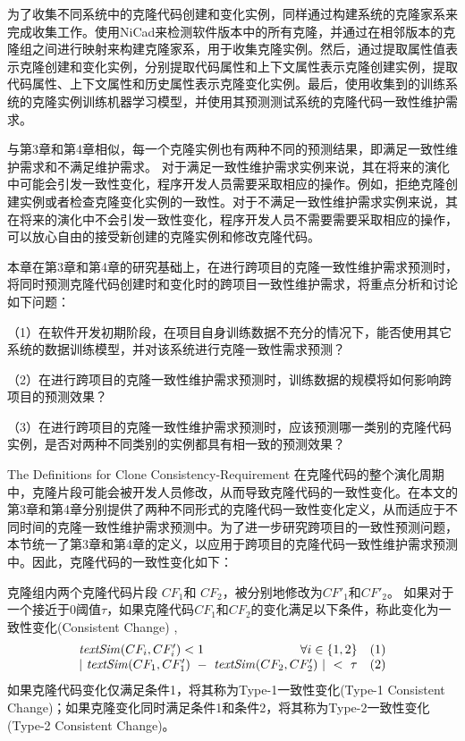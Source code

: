 为了收集不同系统中的克隆代码创建和变化实例，同样通过构建系统的克隆家系来完成收集工作。使用NiCad来检测软件版本中的所有克隆，并通过在相邻版本的克隆组之间进行映射来构建克隆家系，用于收集克隆实例。然后，通过提取属性值表示克隆创建和变化实例，分别提取代码属性和上下文属性表示克隆创建实例，提取代码属性、上下文属性和历史属性表示克隆变化实例。最后，使用收集到的训练系统的克隆实例训练机器学习模型，并使用其预测测试系统的克隆代码一致性维护需求。

与第3章和第4章相似，每一个克隆实例也有两种不同的预测结果，即满足一致性维护需求和不满足维护需求。
对于满足一致性维护需求实例来说，其在将来的演化中可能会引发一致性变化，程序开发人员需要采取相应的操作。例如，拒绝克隆创建实例或者检查克隆变化实例的一致性。对于不满足一致性维护需求实例来说，其在将来的演化中不会引发一致性变化，程序开发人员不需要需要采取相应的操作，可以放心自由的接受新创建的克隆实例和修改克隆代码。

本章在第3章和第4章的研究基础上，在进行跨项目的克隆一致性维护需求预测时，将同时预测克隆代码创建时和变化时的跨项目一致性维护需求，将重点分析和讨论如下问题：


（1）在软件开发初期阶段，在项目自身训练数据不充分的情况下，能否使用其它系统的数据训练模型，并对该系统进行克隆一致性需求预测？

（2）在进行跨项目的克隆一致性维护需求预测时，训练数据的规模将如何影响跨项目的预测效果？%

（3）在进行跨项目的克隆一致性维护需求预测时，应该预测哪一类别的克隆代码实例，是否对两种不同类别的实例都具有相一致的预测效果？

{The Definitions for Clone Consistency-Requirement}
在克隆代码的整个演化周期中，克隆片段可能会被开发人员修改，从而导致克隆代码的一致性变化。在本文的第3章和第4章分别提供了两种不同形式的克隆代码一致性变化定义，从而适应于不同时间的克隆一致性维护需求预测中。为了进一步研究跨项目的一致性预测问题，本节统一了第3章和第4章的定义，以应用于跨项目的克隆代码一致性维护需求预测中。因此，克隆代码的一致性变化如下：

\begin{definition}[克隆一致性变化]  
\label{def-change}
克隆组内两个克隆代码片段 $CF_1$和 $CF_2$，被分别地修改为$CF'_1$和$CF'_2$。 如果对于一个接近于0阈值$\tau$，如果克隆代码$CF_1$和$CF_2$的变化满足以下条件，称此变化为一致性变化(Consistent Change) , 
\[
\begin{array}[t]{crl}
 \mathit{textSim}(CF_i, CF'_i) < 1 & \forall i \in \{1,2\} &(1) \\
 \multicolumn{2}{c}{| ~\mathit{textSim}(CF_1,CF'_1)  ~-~ \mathit{textSim}(CF_2,CF'_2) ~| ~< ~ \tau}  & (2)
\end{array}
\]
如果克隆代码变化仅满足条件1，将其称为Type-1一致性变化(Type-1 Consistent Change)；如果克隆变化同时满足条件1和条件2，将其称为Type-2一致性变化(Type-2 Consistent Change)。
\end{definition}

